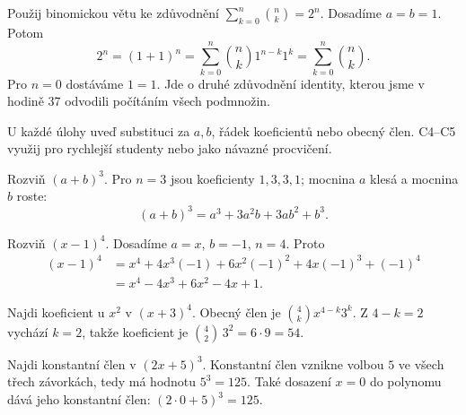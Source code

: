 \documentclass[11pt,a4paper]{article}
\begin{document}
\begin{prikladReseniBox}[title={Příklad P5}]
Použij binomickou větu ke zdůvodnění \(\sum_{k=0}^n\binom nk=2^n\).
\tcblower
Dosadíme $a=b=1$. Potom
\[
 2^n=(1+1)^n=\sum_{k=0}^n\binom nk1^{n-k}1^k
 =\sum_{k=0}^n\binom nk.
\]
Pro $n=0$ dostáváme $1=1$. Jde o druhé zdůvodnění identity, kterou jsme v hodině 37 odvodili počítáním všech podmnožin.
\end{prikladReseniBox}


\newpage
{}

U každé úlohy uveď substituci za $a,b$, řádek koeficientů nebo obecný člen. C4–C5 využij pro rychlejší studenty nebo jako návazné procvičení.

\begin{zadaniReseniBox}[title={Úloha C1}]
Rozviň \((a+b)^3\).
\tcblower
Pro $n=3$ jsou koeficienty $1,3,3,1$; mocnina $a$ klesá a mocnina $b$ roste:
\[
(a+b)^3=a^3+3a^2b+3ab^2+b^3.
\]
\end{zadaniReseniBox}

\begin{zadaniReseniBox}[title={Úloha C2}]
Rozviň \((x-1)^4\).
\tcblower
Dosadíme $a=x$, $b=-1$, $n=4$. Proto
\begin{align*}
(x-1)^4&=x^4+4x^3(-1)+6x^2(-1)^2+4x(-1)^3+(-1)^4\\
&=x^4-4x^3+6x^2-4x+1.
\end{align*}
\end{zadaniReseniBox}

\begin{zadaniReseniBox}[title={Úloha C3}]
Najdi koeficient u \(x^2\) v \((x+3)^4\).
\tcblower
Obecný člen je $\binom4k x^{4-k}3^k$. Z $4-k=2$ vychází $k=2$, takže koeficient je $\binom42\,3^2=6\cdot9=54$.
\end{zadaniReseniBox}

\begin{zadaniReseniBox}[title={Úloha C4}]
Najdi konstantní člen v \((2x+5)^3\).
\tcblower
Konstantní člen vznikne volbou $5$ ve všech třech závorkách, tedy má hodnotu $5^3=125$. Také dosazení $x=0$ do polynomu dává jeho konstantní člen: $(2\cdot0+5)^3=125$.
\end{zadaniReseniBox}
\end{document}
